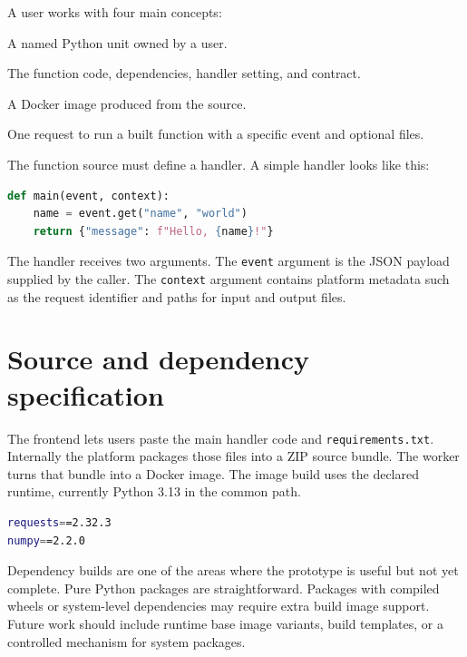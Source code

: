 \documentclass[12pt,a4paper]{report}
\newcommand{\file}[1]{\texttt{#1}}
\begin{document}
A user works with four main concepts:

\begin{description}[leftmargin=2.8cm,style=nextline]
  \item[Function] A named Python unit owned by a user.
  \item[Source] The function code, dependencies, handler setting, and contract.
  \item[Build] A Docker image produced from the source.
  \item[Invocation] One request to run a built function with a specific event and optional files.
\end{description}

The function source must define a handler. A simple handler looks like this:

\begin{lstlisting}[language=Python,caption={Minimal Python handler.}]
def main(event, context):
    name = event.get("name", "world")
    return {"message": f"Hello, {name}!"}
\end{lstlisting}

The handler receives two arguments. The \file{event} argument is the JSON
payload supplied by the caller. The \file{context} argument contains platform
metadata such as the request identifier and paths for input and output files.

\section{Source and dependency specification}

The frontend lets users paste the main handler code and \file{requirements.txt}.
Internally the platform packages those files into a ZIP source bundle. The
worker turns that bundle into a Docker image. The image build uses the declared
runtime, currently Python 3.13 in the common path.

\begin{lstlisting}[language=bash,caption={Example requirements.txt.}]
requests==2.32.3
numpy==2.2.0
\end{lstlisting}

Dependency builds are one of the areas where the prototype is useful but not
yet complete. Pure Python packages are straightforward. Packages with compiled
wheels or system-level dependencies may require extra build image support.
Future work should include runtime base image variants, build templates, or a
controlled mechanism for system packages.
\end{document}
